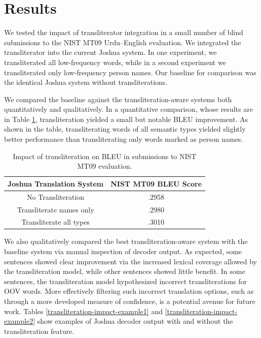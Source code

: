 \documentclass[logo]{pbml}
\begin{document}
\section{Results}
We tested the impact of transliterator integration in a small number of blind submissions to the NIST MT09 Urdu--English evaluation. We integrated the transliterator into the current Joshua system. In one experiment, we transliterated all low-frequency words, while in a second experiment we transliterated only low-frequency person names. Our baseline for comparison was the identical Joshua system without transliterations.

We compared the baseline against the transliteration-aware systems both quantitatively and qualitatively. In a quantitative comparison, whose results are in Table \ref{transliteration-impact-quantitative}, transliteration yielded a small but notable BLEU improvement. As shown in the table, transliterating words of all semantic types yielded slightly better performance than transliterating only words marked as person names.

\begin{table}
\begin{center}
\begin{tabular}{|c|c|}
\hline
\textbf{Joshua Translation System} & \textbf{NIST MT09 BLEU Score} \\ \hline
No Transliteration & .2958 \\ \hline
Transliterate names only & .2980 \\ \hline
Transliterate all types & .3010 \\ \hline
\end{tabular}
\end{center}
\caption{\label{transliteration-impact-quantitative} Impact of transliteration on BLEU in submissions to NIST MT09 evaluation. }
\end{table}


We also qualitatively compared the best transliteration-aware system with the baseline system via manual inspection of decoder output. As expected, some sentences showed clear improvement via the increased lexical coverage allowed by the transliteration model, while other sentences showed little benefit. In some sentences, the transliteration model hypothesized incorrect transliterations for OOV words. More effectively filtering such incorrect translation options, such as through a more developed measure of confidence,  is a potential avenue for future work. Tables \ref{transliteration-impact-example1} and \ref{transliteration-impact-example2} show examples of Joshua decoder output with and without the transliteration feature.
\end{document}
